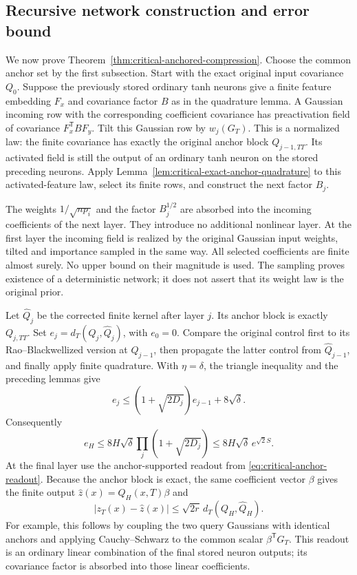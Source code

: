 \subsection{Recursive network construction and error bound}

We now prove Theorem~\ref{thm:critical-anchored-compression}.
Choose the common anchor set by the first subsection. Start with the
exact original input covariance $Q_0$. Suppose the previously stored
ordinary tanh neurons give a finite feature embedding $F_x$ and
covariance factor $B$ as in the quadrature lemma. A Gaussian incoming
row with the corresponding coefficient covariance has preactivation
field of covariance $F_x^{\mathsf T}BF_y$. Tilt this Gaussian row by
$w_j(G_T)$. This is a normalized law: the finite covariance has exactly
the original anchor block $Q_{j-1,TT}$. Its activated field is still
the output of an ordinary tanh neuron on the stored preceding neurons.
Apply Lemma~\ref{lem:critical-exact-anchor-quadrature} to this
activated-feature law, select its finite rows, and construct the next
factor $B_j$.

The weights $1/\sqrt{np_i}$ and the factor $B_j^{1/2}$ are absorbed
into the incoming coefficients of the next layer. They introduce no
additional nonlinear layer. At the first layer the incoming field is
realized by the original Gaussian input weights, tilted and importance
sampled in the same way. All selected coefficients are finite almost
surely. No upper bound on their magnitude is used. The sampling proves
existence of a deterministic network; it does not assert that its weight
law is the original prior.

Let $\widehat Q_j$ be the corrected finite kernel after layer $j$.
Its anchor block is exactly $Q_{j,TT}$. Set
$e_j=d_T(Q_j,\widehat Q_j)$, with $e_0=0$.
Compare the original control first to its Rao--Blackwellized version
at $Q_{j-1}$, then propagate the latter control from
$\widehat Q_{j-1}$, and finally apply finite quadrature. With
$\eta=\delta$, the triangle inequality and the preceding lemmas give
\[
 e_j\le(1+\sqrt{2D_j})e_{j-1}+8\sqrt\delta.
\]
Consequently
\[
 e_H\le8H\sqrt\delta\prod_j(1+\sqrt{2D_j})
       \le8H\sqrt\delta\,e^{\sqrt2S}.
\]
At the final layer use the anchor-supported readout from
\eqref{eq:critical-anchor-readout}. Because the anchor block is
exact, the same coefficient vector $\beta$ gives the finite output
$\widehat z(x)=\widehat Q_H(x,T)\beta$ and
\[
 |z_T(x)-\widehat z(x)|
 \le\sqrt{2r}\,d_T(Q_H,\widehat Q_H).
\]
For example, this follows by coupling the two query Gaussians with
identical anchors and applying Cauchy--Schwarz to the common scalar
$\beta^{\mathsf T}G_T$. This readout is an ordinary linear combination
of the final stored neuron outputs; its covariance factor is absorbed
into those linear coefficients.


